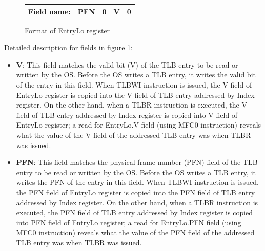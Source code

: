 \documentclass[]{scrartcl}
\begin{document}
\begin{itemize}
\begin{figure}[H]
\begin{center}
\begin{tabular}{|c|c|c|c|c|}
\hline \textbf{Field name:}   & PFN    & 0      & V & 0    \\

\hline

\end{tabular}

\end{center}
\caption{Format of EntryLo register}
\label{entrylo_reg}
\end{figure}

Detailed description for fields in figure \ref{entrylo_reg}:

\begin{itemize}

\item \textbf{V}: This field matches the valid bit (V) of the
                  TLB entry to be read or written by the OS.
                  Before the OS writes a TLB entry, it writes
                  the valid bit of the entry in this field. When
                  TLBWI instruction is issued, the V field of
                  EntryLo register is copied into the V field
                  of TLB entry addressed by Index register. On
                  the other hand, when a TLBR instruction is
                  executed, the V field of TLB entry addressed
                  by Index register is copied into V field of
                  EntryLo register; a read for EntryLo.V field
                  (using MFC0 instruction) reveals what
                  the value of the V field of the addressed
                  TLB entry was when TLBR was issued. 

\item \textbf{PFN}: This field matches the physical frame number
                    (PFN) field of the
                    TLB entry to be read or written by the OS.
                    Before the OS writes a TLB entry, it writes
                    the PFN of the entry in this field. When
                    TLBWI instruction is issued, the PFN field of
                    EntryLo register is copied into the PFN field
                    of TLB entry addressed by Index register. On
                    the other hand, when a TLBR instruction is
                    executed, the PFN field of TLB entry addressed
                    by Index register is copied into PFN field of
                    EntryLo register; a read for EntryLo.PFN field
                    (using MFC0 instruction) reveals what
                    the value of the PFN field of the addressed
                    TLB entry was when TLBR was issued. 


\end{itemize}
\end{itemize}
\end{document}
